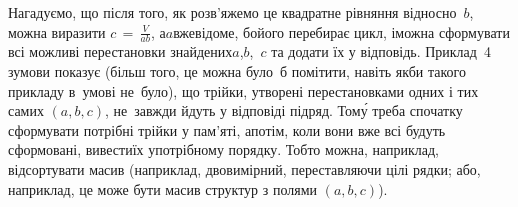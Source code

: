 

Нагадуємо, що після того, як розв'яжемо це квадратне рівняння відносно~$b$, можна виразити $c\,{=}\,\frac{V}{ab}$, а\nolinebreak[3] $a$\nolinebreak[2] вже\nolinebreak[3] відоме, бо\nolinebreak[3] його перебирає цикл, і\nolinebreak[3] можна сформувати всі можливі перестановки знайдених\nolinebreak[2] $a$,\nolinebreak[3] $b$,~$c$ та додати їх у відповідь.
Приклад~4 з\nolinebreak[3] умови показує (більш того, це можна було~б помітити, навіть якби такого прикладу в~умові не~було), що трійки, утворені перестановками одних і тих самих $(a,b,c)$, не~завжди йдуть у відповіді підряд. 
Том\'{у} треба спочатку сформувати потрібні трійки у пам'яті, а\nolinebreak[3] потім, коли вони вже всі будуть сформовані, вивести\nolinebreak[2] їх у\nolinebreak[3] потрібному порядку. Тобто можна, наприклад, відсортувати масив (наприклад, двовимірний, переставляючи цілі рядки; або, наприклад, це може бути масив структур з полями $(a,b,c)$).

